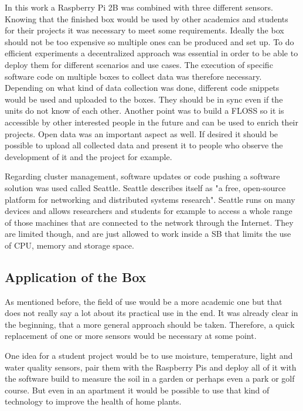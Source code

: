 \documentclass[bachelorthesis, grey, english]{mas-thesis-chapters} %
\begin{document}
In this work a Raspberry Pi 2B was combined with three different sensors. Knowing that the finished box would be used by other academics and students for their projects it was necessary to meet some requirements. Ideally the box should not be too expensive so multiple ones can be produced and set up. To do efficient experiments a decentralized approach was essential in order to be able to deploy them for different scenarios and use cases. The execution of specific software code on multiple boxes to collect data was therefore necessary. Depending on what kind of data collection was done, different code snippets would be used and uploaded to the boxes. They should be in sync even if the units do not know of each other. Another point was to build a \gls{FLOSS} so it is accessible by other interested people in the future and can be used to enrich their projects. Open data was an important aspect as well. If desired it should be possible to upload all collected data and present it to people who observe the development of it and the project for example.

Regarding cluster management, software updates or code pushing a software solution was used called Seattle. Seattle describes itself as "a free, open-source platform for networking and distributed systems research". Seattle runs on many devices and allows researchers and students for example to access a whole range of those machines that are connected to the network through the Internet. They are limited though, and are just allowed to work inside a \gls{SB} that limits the use of \gls{CPU}, memory and storage space. 
\cite{seattleGithub}

\subsection{Application of the Box}

As mentioned before, the field of use would be a more academic one but that does not really say a lot about its practical use in the end. It was already clear in the beginning, that a more general approach should be taken. Therefore, a quick replacement of one or more sensors would be necessary at some point. 

One idea for a student project would be to use moisture, temperature, light and water quality sensors, pair them with the Raspberry Pis and deploy all of it with the software build to measure the soil in a garden or perhaps even a park or golf course. But even in an apartment it would be possible to use that kind of technology to improve the health of home plants.
\end{document}
